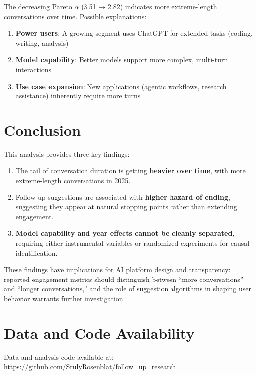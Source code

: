 \documentclass[11pt]{article}
\begin{document}
The decreasing Pareto $\alpha$ (3.51 → 2.82) indicates more extreme-length conversations over time. Possible explanations:
\begin{enumerate}
    \item \textbf{Power users}: A growing segment uses ChatGPT for extended tasks (coding, writing, analysis)
    \item \textbf{Model capability}: Better models support more complex, multi-turn interactions
    \item \textbf{Use case expansion}: New applications (agentic workflows, research assistance) inherently require more turns
\end{enumerate}

\section{Conclusion}

This analysis provides three key findings:

\begin{enumerate}
    \item The tail of conversation duration is getting \textbf{heavier over time}, with more extreme-length conversations in 2025.

    \item Follow-up suggestions are associated with \textbf{higher hazard of ending}, suggesting they appear at natural stopping points rather than extending engagement.

    \item \textbf{Model capability and year effects cannot be cleanly separated}, requiring either instrumental variables or randomized experiments for causal identification.
\end{enumerate}

These findings have implications for AI platform design and transparency: reported engagement metrics should distinguish between ``more conversations'' and ``longer conversations,'' and the role of suggestion algorithms in shaping user behavior warrants further investigation.

\section*{Data and Code Availability}

Data and analysis code available at: \url{https://github.com/SrulyRosenblat/follow_up_research}
\end{document}
